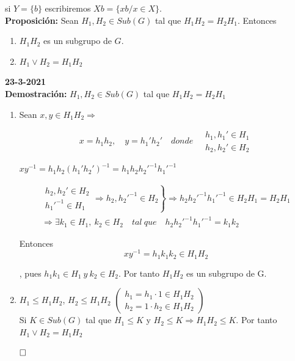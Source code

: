 \documentclass{article}
\begin{document}
si $Y=\{b\}$ escribiremos $Xb=\{xb/x\in X\}$. \\

\textbf{Proposición:} Sean $H_1,H_2 \in Sub(G)$ tal que $H_1H_2=H_2H_1$. Entonces

\begin{enumerate}[1)]
\item $H_1H_2$ es un subgrupo de $G$.

\item $H_1\lor H_2=H_1H_2$
\end{enumerate}

\textbf{23-3-2021} \\

\textbf{Demostración:} $H_1,H_2\in Sub(G)$ tal que $H_1H_2=H_2H_1$

\begin{enumerate}[1)]
\item Sean $x,y\in H_1H_2 \Rightarrow$

\begin{equation*}
x=h_1h_2,\quad y=h_1'h_2' \quad donde \quad 
\left. \begin{array}{c}
h_1,h_1'\in H_1 \\
h_2,h_2'\in H_2
\end{array} \right.
\end{equation*}

$xy^{-1}=h_1h_2(h_1'h_2')^{-1}=h_1h_2h_2'^{-1} h_1'^{-1}$

\begin{gather*}
\left. \left. \begin{array}{c}
h_2,h_2'\in H_2 \\
h_1'^{-1} \in H_1
\end{array} \right.
\Rightarrow h_2, h_2'^{-1} \in H_2 \right\rbrace
\Rightarrow h_2h_2'^{-1}h_1'^{-1}\in H_2H_1=H_2H_1 \\
\Rightarrow \exists k_1\in H_1,\:k_2\in H_2 \quad tal \: que \quad h_2h_2'^{-1}h_1'^{-1}=k_1k_2
\end{gather*}

Entonces 
\begin{equation*}
xy^{-1}=h_1k_1k_2 \in H_1H_2
\end{equation*}

, pues $h_1k_1 \in H_1 \: y \: k_2\in H_2$. Por tanto $H_1H_2$ es un subgrupo de G.

\item $H_1\leq H_1H_2$, $H_2\leq H_1H_2$ 
$\left( \begin{array}{c}
h_1=h_1\cdot 1\in H_1H_2 \\
h_2=1\cdot h_2\in H_1H_2
\end{array} \right)$ \\

Si $K \in Sub(G)$ tal que $H_1\leq K$ y $H_2\leq K\Rightarrow H_1H_2\leq K$. Por tanto $H_1\lor H_2=H_1H_2$

$\hfill\square$ \\

\end{enumerate}
\end{document}
